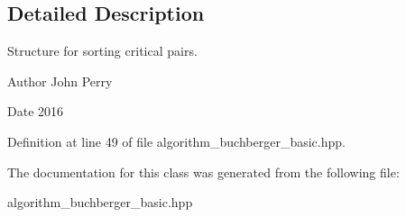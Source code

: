 \subsection{Detailed Description}
Structure for sorting critical pairs. 

\begin{DoxyAuthor}{Author}
John Perry 
\end{DoxyAuthor}
\begin{DoxyDate}{Date}
2016 
\end{DoxyDate}


Definition at line 49 of file algorithm\+\_\+buchberger\+\_\+basic.\+hpp.



The documentation for this class was generated from the following file\+:\begin{DoxyCompactItemize}
\item 
algorithm\+\_\+buchberger\+\_\+basic.\+hpp\end{DoxyCompactItemize}
